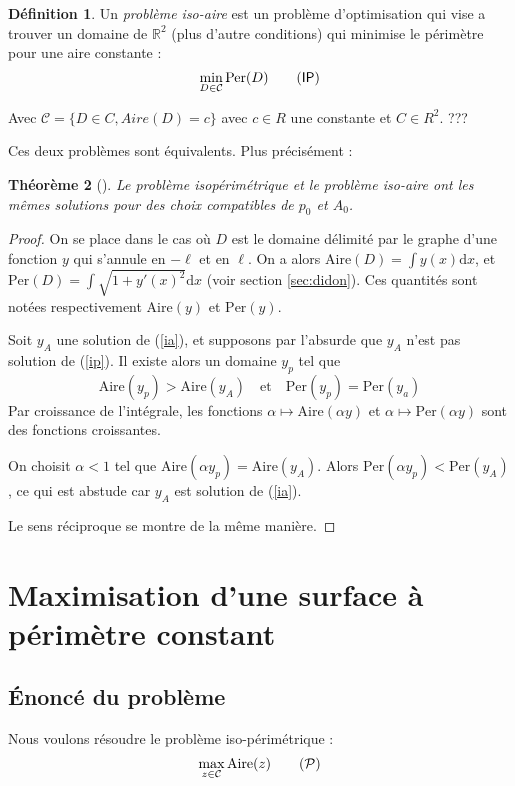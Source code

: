 \documentclass[10pt,a4paper]{article}
\newcommand{\R}{\mathbb{R}}
\newcommand{\C}{\mathcal{C}}
\renewcommand{\d}{\mathrm{d}}
\renewcommand{\P}{\mathcal{P}}
\newcommand{\A}{\mathrm{Aire}}
\newcommand{\p}{\mathrm{Per}}
\newcommand{\IP}{\textsf{IP}}
\theoremstyle{plain}
\newtheorem{thm}{Théorème}[section]
\theoremstyle{definition}
\newtheorem{defi}[thm]{Définition}
\begin{document}
\begin{defi}
Un \emph{problème iso-aire} est un problème d'optimisation qui vise a trouver un domaine de $\R^2$ (plus d'autre conditions) qui minimise le périmètre pour une aire constante :
\[\min_{D \in \C} \p(D) \label{ip}\tag{\IP}\]

Avec $\mathcal{C} = \{ D \in C, Aire(D)=c \}$ avec $c \in R$ une constante et $C \in R^2$. ???
\end{defi}


Ces deux problèmes sont équivalents. Plus précisément :

\begin{thm}[\cite{tapia09}]
Le problème isopérimétrique et le problème iso-aire ont les mêmes solutions pour des choix compatibles de $p_0$ et $A_0$.
\end{thm}


\begin{proof}
On se place dans le cas où $D$ est le domaine délimité par le graphe d'une fonction $y$ qui s'annule en $-\ell$ et en $\ell$. On a alors $\A(D)=\int y(x)\d x$, et $\p(D)=\int\sqrt{1+y'(x)^2}\d x$ (voir section \ref{sec:didon}). Ces quantités sont notées respectivement $\A(y)$ et $\p(y)$.

Soit $y_A$ une solution de (\ref{ia}), et supposons par l'absurde que $y_A$ n'est pas solution de (\ref{ip}). Il existe alors un domaine $y_p$ tel que \[\A(y_p)>\A(y_A)\quad\text{et}\quad \p(y_p)=\p(y_a)\]
Par croissance de l'intégrale, les fonctions $\alpha\mapsto\A(\alpha y)$ et $\alpha\mapsto\p(\alpha y)$ sont des fonctions croissantes.

On choisit $\alpha<1$ tel que $\A(\alpha y_p)=\A(y_A)$. Alors $\p(\alpha y_p)<\p(y_A)$, ce qui est abstude car $y_A$ est solution de (\ref{ia}).

Le sens réciproque se montre de la même manière.
\end{proof}


\section{Maximisation d'une surface à périmètre constant}

\subsection{Énoncé du problème}

Nous voulons résoudre le problème iso-périmétrique :
\[\max_{z \in \mathcal{C}} \A(z) \label{eq:p}\tag{$\P$}\]
\end{document}

